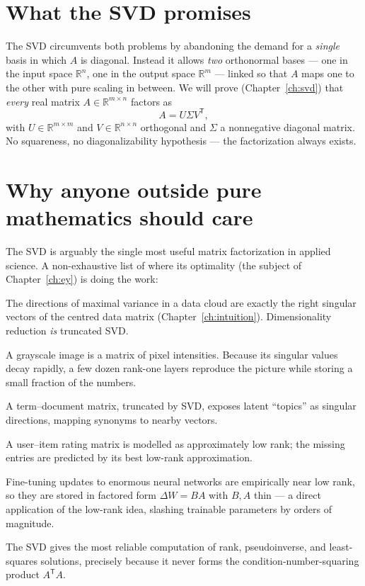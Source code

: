 \documentclass[11pt,oneside]{book}
\theoremstyle{plain}
\theoremstyle{definition}
\theoremstyle{remark}
\newcommand{\R}{\mathbb{R}}
\newcommand{\T}{^{\mathsf T}}
\begin{document}
\section{What the SVD promises}

The SVD circumvents both problems by abandoning the demand for a \emph{single} basis in
which $A$ is diagonal. Instead it allows \emph{two} orthonormal bases --- one in the
input space $\R^n$, one in the output space $\R^m$ --- linked so that $A$ maps one to
the other with pure scaling in between. We will prove (Chapter~\ref{ch:svd}) that
\emph{every} real matrix $A\in\R^{m\times n}$ factors as
\[
A=U\Sigma V\T,
\]
with $U\in\R^{m\times m}$ and $V\in\R^{n\times n}$ orthogonal and $\Sigma$ a
nonnegative diagonal matrix. No squareness, no diagonalizability hypothesis --- the
factorization always exists.

\section{Why anyone outside pure mathematics should care}

The SVD is arguably the single most useful matrix factorization in applied science.
A non-exhaustive list of where its optimality (the subject of Chapter~\ref{ch:ey})
is doing the work:

\begin{description}[style=nextline,leftmargin=1.6em]
\item[Principal Component Analysis (PCA).] The directions of maximal variance in a data
cloud are exactly the right singular vectors of the centred data matrix
(Chapter~\ref{ch:intuition}). Dimensionality reduction \emph{is} truncated SVD.
\item[Image compression.] A grayscale image is a matrix of pixel intensities. Because
its singular values decay rapidly, a few dozen rank-one layers reproduce the picture
while storing a small fraction of the numbers.
\item[Latent Semantic Analysis (LSA).] A term--document matrix, truncated by SVD,
exposes latent ``topics'' as singular directions, mapping synonyms to nearby vectors.
\item[Recommendation systems.] A user--item rating matrix is modelled as approximately
low rank; the missing entries are predicted by its best low-rank approximation.
\item[LoRA (Low-Rank Adaptation).] Fine-tuning updates to enormous neural networks are
empirically near low rank, so they are stored in factored form $\Delta W=BA$ with $B,A$
thin --- a direct application of the low-rank idea, slashing trainable parameters by
orders of magnitude.
\item[Numerical stability.] The SVD gives the most reliable computation of rank,
pseudoinverse, and least-squares solutions, precisely because it never forms the
condition-number-squaring product $A\T A$.
\end{description}
\end{document}
